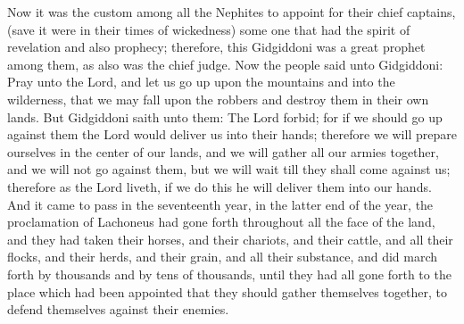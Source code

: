 Now it was the custom among all the Nephites to appoint for their chief captains, (save it were in their times of wickedness) some one that had the spirit of revelation and also prophecy; therefore, this Gidgiddoni was a great prophet among them, as also was the chief judge.
\bverse \iffalse Now the people said unto Gidgiddoni: Pray unto the Lord, and let us go up upon the mountains and into the wilderness, that we may fall upon the robbers and destroy them in their own lands. \fi
Now the people said unto Gidgiddoni: Pray unto the Lord, and let us go up upon the mountains and into the wilderness, that we may fall upon the robbers and destroy them in their own lands.
\bverse \iffalse But Gidgiddoni saith unto them: The Lord forbid; for if we should go up against them the Lord would deliver us into their hands; therefore we will prepare ourselves in the center of our lands, and we will gather all our armies together, and we will not go against them, but we will wait till they shall come against us; therefore as the Lord liveth, if we do this he will deliver them into our hands. \fi
But Gidgiddoni saith unto them: The Lord forbid; for if we should go up against them the Lord would deliver us into their hands; therefore we will prepare ourselves in the center of our lands, and we will gather all our armies together, and we will not go against them, but we will wait till they shall come against us; therefore as the Lord liveth, if we do this he will deliver them into our hands.
\bverse \iffalse And it came to pass in the seventeenth year, in the latter end of the year, the proclamation of Lachoneus had gone forth throughout all the face of the land, and they had taken their horses, and their chariots, and their cattle, and all their flocks, and their herds, and their grain, and all their substance, and did march forth by thousands and by tens of thousands, until they had all gone forth to the place which had been appointed that they should gather themselves together, to defend themselves against their enemies. \fi
And it came to pass in the seventeenth year, in the latter end of the year, the proclamation of Lachoneus had gone forth throughout all the face of the land, and they had taken their horses, and their chariots, and their cattle, and all their flocks, and their herds, and their grain, and all their substance, and did march forth by thousands and by tens of thousands, until they had all gone forth to the place which had been appointed that they should gather themselves together, to defend themselves against their enemies.
